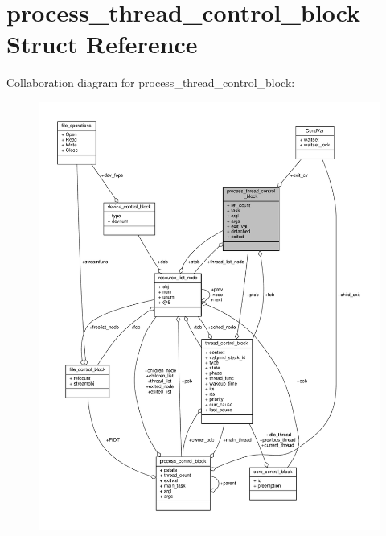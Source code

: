 \hypertarget{structprocess__thread__control__block}{}\section{process\+\_\+thread\+\_\+control\+\_\+block Struct Reference}
\label{structprocess__thread__control__block}


Collaboration diagram for process\+\_\+thread\+\_\+control\+\_\+block\+:\nopagebreak
\begin{figure}[H]
\begin{center}
\leavevmode
\includegraphics[width=350pt]{structprocess__thread__control__block__coll__graph}
\end{center}
\end{figure}
